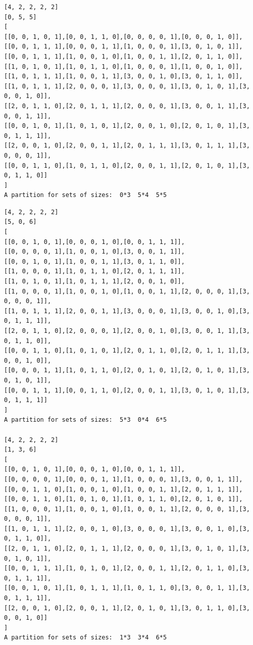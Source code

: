 \documentclass[final]{dmtcs-episciences}
\begin{document}
\begin{appendices}
\begin{verbatim}
[4, 2, 2, 2, 2]
[0, 5, 5]
[
[[0, 0, 1, 0, 1],[0, 0, 1, 1, 0],[0, 0, 0, 0, 1],[0, 0, 0, 1, 0]],
[[0, 0, 1, 1, 1],[0, 0, 0, 1, 1],[1, 0, 0, 0, 1],[3, 0, 1, 0, 1]],
[[0, 0, 1, 1, 1],[1, 0, 0, 1, 0],[1, 0, 0, 1, 1],[2, 0, 1, 1, 0]],
[[1, 0, 1, 0, 1],[1, 0, 1, 1, 0],[1, 0, 0, 0, 1],[1, 0, 0, 1, 0]],
[[1, 0, 1, 1, 1],[1, 0, 0, 1, 1],[3, 0, 0, 1, 0],[3, 0, 1, 1, 0]],
[[1, 0, 1, 1, 1],[2, 0, 0, 0, 1],[3, 0, 0, 0, 1],[3, 0, 1, 0, 1],[3, 0, 0, 1, 0]],
[[2, 0, 1, 1, 0],[2, 0, 1, 1, 1],[2, 0, 0, 0, 1],[3, 0, 0, 1, 1],[3, 0, 0, 1, 1]],
[[0, 0, 1, 0, 1],[1, 0, 1, 0, 1],[2, 0, 0, 1, 0],[2, 0, 1, 0, 1],[3, 0, 1, 1, 1]],
[[2, 0, 0, 1, 0],[2, 0, 0, 1, 1],[2, 0, 1, 1, 1],[3, 0, 1, 1, 1],[3, 0, 0, 0, 1]],
[[0, 0, 1, 1, 0],[1, 0, 1, 1, 0],[2, 0, 0, 1, 1],[2, 0, 1, 0, 1],[3, 0, 1, 1, 0]]
]
A partition for sets of sizes:  0*3  5*4  5*5
\end{verbatim}

\newpage

\begin{verbatim} 
[4, 2, 2, 2, 2]
[5, 0, 6]
[
[[0, 0, 1, 0, 1],[0, 0, 0, 1, 0],[0, 0, 1, 1, 1]],
[[0, 0, 0, 0, 1],[1, 0, 0, 1, 0],[3, 0, 0, 1, 1]],
[[0, 0, 1, 0, 1],[1, 0, 0, 1, 1],[3, 0, 1, 1, 0]],
[[1, 0, 0, 0, 1],[1, 0, 1, 1, 0],[2, 0, 1, 1, 1]],
[[1, 0, 1, 0, 1],[1, 0, 1, 1, 1],[2, 0, 0, 1, 0]],
[[1, 0, 0, 0, 1],[1, 0, 0, 1, 0],[1, 0, 0, 1, 1],[2, 0, 0, 0, 1],[3, 0, 0, 0, 1]],
[[1, 0, 1, 1, 1],[2, 0, 0, 1, 1],[3, 0, 0, 0, 1],[3, 0, 0, 1, 0],[3, 0, 1, 1, 1]],
[[2, 0, 1, 1, 0],[2, 0, 0, 0, 1],[2, 0, 0, 1, 0],[3, 0, 0, 1, 1],[3, 0, 1, 1, 0]],
[[0, 0, 1, 1, 0],[1, 0, 1, 0, 1],[2, 0, 1, 1, 0],[2, 0, 1, 1, 1],[3, 0, 0, 1, 0]],
[[0, 0, 0, 1, 1],[1, 0, 1, 1, 0],[2, 0, 1, 0, 1],[2, 0, 1, 0, 1],[3, 0, 1, 0, 1]],
[[0, 0, 1, 1, 1],[0, 0, 1, 1, 0],[2, 0, 0, 1, 1],[3, 0, 1, 0, 1],[3, 0, 1, 1, 1]]
]
A partition for sets of sizes:  5*3  0*4  6*5

[4, 2, 2, 2, 2]
[1, 3, 6]
[
[[0, 0, 1, 0, 1],[0, 0, 0, 1, 0],[0, 0, 1, 1, 1]],
[[0, 0, 0, 0, 1],[0, 0, 0, 1, 1],[1, 0, 0, 0, 1],[3, 0, 0, 1, 1]],
[[0, 0, 1, 1, 0],[1, 0, 0, 1, 0],[1, 0, 0, 1, 1],[2, 0, 1, 1, 1]],
[[0, 0, 1, 1, 0],[1, 0, 1, 0, 1],[1, 0, 1, 1, 0],[2, 0, 1, 0, 1]],
[[1, 0, 0, 0, 1],[1, 0, 0, 1, 0],[1, 0, 0, 1, 1],[2, 0, 0, 0, 1],[3, 0, 0, 0, 1]],
[[1, 0, 1, 1, 1],[2, 0, 0, 1, 0],[3, 0, 0, 0, 1],[3, 0, 0, 1, 0],[3, 0, 1, 1, 0]],
[[2, 0, 1, 1, 0],[2, 0, 1, 1, 1],[2, 0, 0, 0, 1],[3, 0, 1, 0, 1],[3, 0, 1, 0, 1]],
[[0, 0, 1, 1, 1],[1, 0, 1, 0, 1],[2, 0, 0, 1, 1],[2, 0, 1, 1, 0],[3, 0, 1, 1, 1]],
[[0, 0, 1, 0, 1],[1, 0, 1, 1, 1],[1, 0, 1, 1, 0],[3, 0, 0, 1, 1],[3, 0, 1, 1, 1]],
[[2, 0, 0, 1, 0],[2, 0, 0, 1, 1],[2, 0, 1, 0, 1],[3, 0, 1, 1, 0],[3, 0, 0, 1, 0]]
]
A partition for sets of sizes:  1*3  3*4  6*5


\end{verbatim}
\end{appendices}
\end{document}

